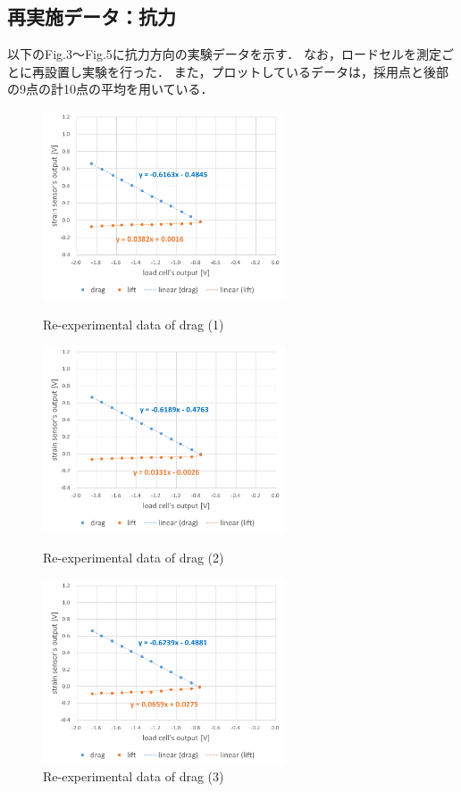 \documentclass[twocolumn,a4j]{jsarticle}
\begin{document}
\newpage
\subsection{再実施データ：抗力}
以下のFig.3～Fig.5に抗力方向の実験データを示す．
なお，ロードセルを測定ごとに再設置し実験を行った．
また，プロットしているデータは，採用点と後部の9点の計10点の平均を用いている．
\begin{figure}[htbp]
    \footnotesize
    \begin{center}
        \includegraphics[width=72mm]{../images/graph_21119_drag_1.png}
        \caption{Re-experimental data of drag (1)}
        \includegraphics[width=72mm]{../images/graph_21119_drag_2.png}
        \caption{Re-experimental data of drag (2)}
        \includegraphics[width=72mm]{../images/graph_211111_drag_3.png}
        \caption{Re-experimental data of drag (3)}
    \end{center}
\end{figure}
\end{document}
